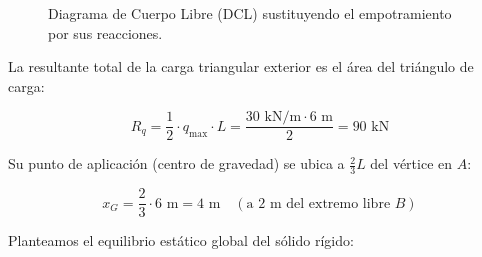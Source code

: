 \begin{figure}[H]
{%

    }

    \caption{Diagrama de Cuerpo Libre (DCL) sustituyendo el empotramiento por sus reacciones.}

    \label{fig:viga_triangular_dcl}

\end{figure}






La resultante total de la carga triangular exterior es el área del triángulo de carga:

\begin{equation}

    R_q = \frac{1}{2} \cdot q_{\max} \cdot L = \frac{30\text{ kN/m} \cdot 6\text{ m}}{2} = 90\text{ kN}

\end{equation}

Su punto de aplicación (centro de gravedad) se ubica a $\frac{2}{3}L$ del vértice en $A$:

\begin{equation}

    x_G = \frac{2}{3} \cdot 6\text{ m} = 4\text{ m} \quad (\text{a } 2\text{ m del extremo libre } B)

\end{equation}



Planteamos el equilibrio estático global del sólido rígido:

